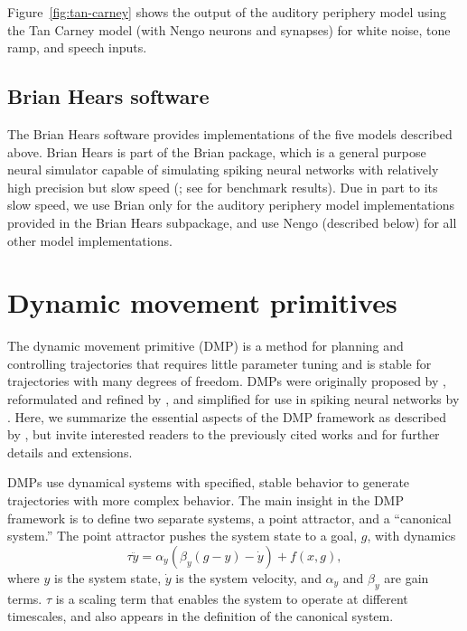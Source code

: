 Figure~\ref{fig:tan-carney} shows the output
of the auditory periphery model
using the Tan Carney model
(with Nengo neurons and synapses)
for white noise, tone ramp, and speech inputs.


\subsection{Brian Hears software}
\label{sec:brian-hears}

The Brian Hears software
\citep{fontaine2011}
provides implementations
of the five models described above.
Brian Hears is part of the
Brian package,
which is a general purpose
neural simulator capable
of simulating spiking neural networks
with relatively high precision
but slow speed
(\citealp{goodman2008};
see \citealt{bekolay2013} for benchmark results).
Due in part to its slow speed,
we use Brian only for
the auditory periphery model implementations
provided in the Brian Hears subpackage,
and use Nengo (described below)
for all other model implementations.

\section{Dynamic movement primitives}
\label{sec:methods-dmp}

The dynamic movement primitive (DMP)
is a method for planning and controlling trajectories
that requires little parameter tuning
and is stable for trajectories
with many degrees of freedom.
DMPs were originally proposed
by \citet{schaal2005,schaal2006},
reformulated and refined by \citet{ijspeert2007},
and simplified for use in spiking neural networks
by \citet{dewolf2015}.
Here, we summarize the essential aspects
of the DMP framework as described by \citet{dewolf2015},
but invite interested readers to
the previously cited works
and \citet{vijayakumar2005,ijspeert2013}
for further details and extensions.

DMPs use dynamical systems
with specified, stable behavior
to generate trajectories
with more complex behavior.
The main insight in the DMP framework
is to define two separate systems,
a point attractor,
and a ``canonical system.''
The point attractor pushes
the system state to
a goal, $g$, with dynamics
\begin{equation} \label{dmp-pointattractor}
  \tau\ddot{y} = \alpha_y(\beta_y(g - y) - \dot{y}) + f(x, g),
\end{equation}
where $y$ is the system state,
$\dot{y}$ is the system velocity,
and $\alpha_y$ and $\beta_y$ are gain terms.
$\tau$ is a scaling term
that enables the system to operate
at different timescales,
and also appears in the definition
of the canonical system.

